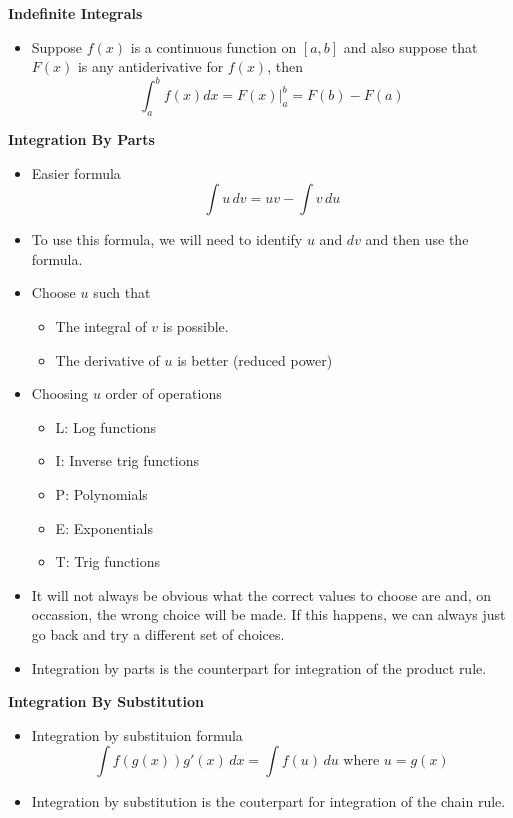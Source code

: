 \documentclass[11pt]{article}
\begin{document}
\textbf{Indefinite Integrals}
\begin{itemize}
    \item Suppose $f(x)$ is a continuous function on $[a,b]$ and also suppose that $F(x)$ is
    any antiderivative for $f(x)$, then 
    \[ \int_{a}^{b} f(x) dx = F(x)|_a^b = F(b) - F(a) \]
\end{itemize}

\textbf{Integration By Parts}
\begin{itemize}
    \item Easier formula
    \[ \int u \,dv = uv - \int v \,du\]
    \item To use this formula, we will need to identify $u$ and $dv$ and then use the formula.
    \item Choose $u$ such that
    \begin{itemize}
        \item The integral of $v$ is possible.
        \item The derivative of $u$ is better (reduced power)
    \end{itemize}
    \item Choosing $u$ order of operations
    \begin{itemize}
        \item L: Log functions
        \item I: Inverse trig functions
        \item P: Polynomials
        \item E: Exponentials
        \item T: Trig functions
    \end{itemize}
    \item It will not always be obvious what the correct values to choose are and, on 
    occassion, the wrong choice will be made. If this happens, we can always just go back and
    try a different set of choices. 
    \item Integration by parts is the counterpart for integration of the product rule.
\end{itemize}

\textbf{Integration By Substitution}
\begin{itemize}
    \item Integration by substituion formula
    \[ \int f(g(x)) g'(x) \,dx = \int f(u) \,du \text{\ \ \ where } u = g(x) \]
    \item Integration by substitution is the couterpart for integration of the chain rule.
\end{itemize}
\end{document}
